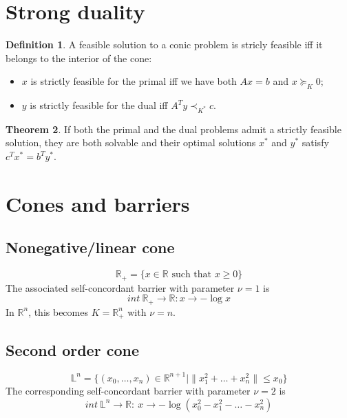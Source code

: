 \documentclass[12pt, openany]{report}
\newcommand{\R}{\mathbb{R}}
\theoremstyle{definition}
\newtheorem{thm}{Theorem}[chapter]
\newtheorem{definition}[thm]{Definition}
\begin{document}
\section{Strong duality}
\begin{definition}
    A feasible solution to a conic problem is stricly feasible iff it belongs to the interior of the cone:
    \begin{itemize}
        \item $x$ is strictly feasible for the primal iff we have both $Ax=b$ and $x\succeq_K0$;
        \item $y$ is strictly feasible for the dual iff $A^Ty\prec_{K^*}c$.
    \end{itemize}
\end{definition}
\begin{thm}
    If both the primal and the dual problems admit a strictly feasible solution, they are both solvable and their optimal solutions $x^*$ and $y^*$ satisfy $c^Tx^*=b^Ty^*$.
\end{thm}
\section{Cones and barriers}
\subsection{Nonegative/linear cone}
\begin{equation}
    \R_+=\{x\in\R \text{ such that }x\ge 0\}
\end{equation}
The associated self-concordant barrier with parameter $\nu=1$ is 
\begin{equation}
    int \: \R_+ \rightarrow \R:x\rightarrow -\log x
\end{equation}
In $\R^n$, this becomes $K=\R_+^n$ with $\nu=n$. 
\subsection{Second order cone}
\begin{equation}
    \mathbb{L}^n = \{(x_0,\dots,x_n)\in \R^{n+1}|\lVert x_1^2+\dots+x_n^2\rVert\le x_0\}
\end{equation}
The corresponding self-concordant barrier with parameter $\nu=2$ is 
\begin{equation}
    int \: \mathbb{L}^n \rightarrow \R :\: x \rightarrow -\log(x_0^2-x_1^2 - \dots-x_n^2)
\end{equation}
\end{document}
